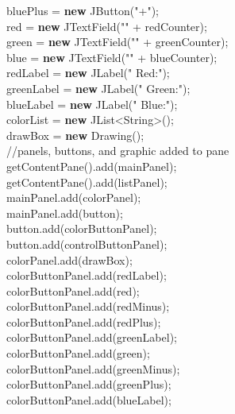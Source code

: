 \documentclass[12pt]{article}
\begin{document}
\begin{flushleft}
{\qquad \qquad \qquad			bluePlus = \textbf{new} JButton("+");\\
\qquad \qquad \qquad			red = \textbf{new} JTextField("" + redCounter);\\ 
\qquad \qquad \qquad			green = \textbf{new} JTextField("" + greenCounter);\\
\qquad \qquad \qquad			blue = \textbf{new} JTextField("" + blueCounter);\\
\qquad \qquad \qquad			redLabel = \textbf{new} JLabel(" Red:");\\
\qquad \qquad \qquad			greenLabel = \textbf{new} JLabel(" Green:");\\
\qquad \qquad \qquad			blueLabel = \textbf{new} JLabel(" Blue:");\\
\qquad \qquad \qquad			colorList = \textbf{new} JList<String>();\\ 
\qquad \qquad \qquad			drawBox = \textbf{new} Drawing();\\
			[2mm]
\qquad \qquad \qquad			//panels, buttons, and graphic added to pane\\
\qquad \qquad \qquad			getContentPane().add(mainPanel);\\
\qquad \qquad \qquad			getContentPane().add(listPanel);\\
\qquad \qquad \qquad			mainPanel.add(colorPanel);\\
\qquad \qquad \qquad			mainPanel.add(button);\\
\qquad \qquad \qquad			button.add(colorButtonPanel);\\
\qquad \qquad \qquad			button.add(controlButtonPanel);\\
\qquad \qquad \qquad			colorPanel.add(drawBox);\\
\qquad \qquad \qquad			colorButtonPanel.add(redLabel);\\
\qquad \qquad \qquad			colorButtonPanel.add(red);\\
\qquad \qquad \qquad			colorButtonPanel.add(redMinus);\\
\qquad \qquad \qquad			colorButtonPanel.add(redPlus);\\
\qquad \qquad \qquad			colorButtonPanel.add(greenLabel);\\
\qquad \qquad \qquad			colorButtonPanel.add(green);\\
\qquad \qquad \qquad			colorButtonPanel.add(greenMinus);\\
\qquad \qquad \qquad			colorButtonPanel.add(greenPlus);\\
\qquad \qquad \qquad			colorButtonPanel.add(blueLabel);\\
}
\end{flushleft}
\end{document}
